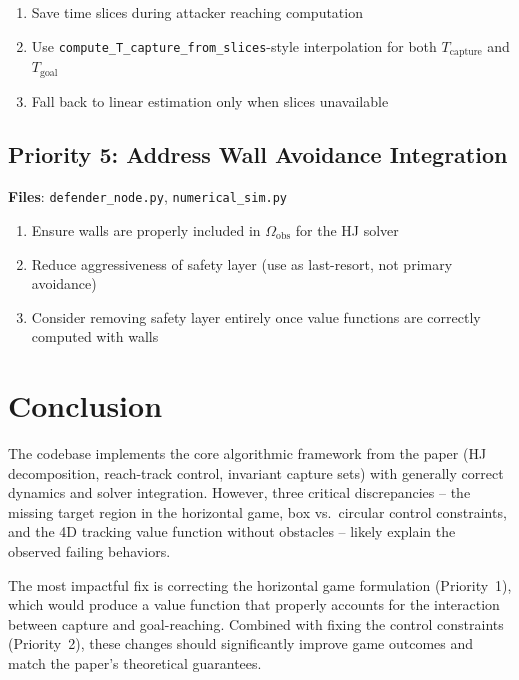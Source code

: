 \documentclass[11pt,a4paper]{article}
\begin{document}
\begin{enumerate}[nosep]
\item Save time slices during attacker reaching computation
\item Use \texttt{compute\_T\_capture\_from\_slices}-style interpolation for both $T_{\mathrm{capture}}$ and $T_{\mathrm{goal}}$
\item Fall back to linear estimation only when slices unavailable
\end{enumerate}

\subsection{Priority 5: Address Wall Avoidance Integration}
\textbf{Files}: \texttt{defender\_node.py}, \texttt{numerical\_sim.py}

\begin{enumerate}[nosep]
\item Ensure walls are properly included in $\Omega_{\mathrm{obs}}$ for the HJ solver
\item Reduce aggressiveness of safety layer (use as last-resort, not primary avoidance)
\item Consider removing safety layer entirely once value functions are correctly computed with walls
\end{enumerate}

\section{Conclusion}

The codebase implements the core algorithmic framework from the paper (HJ decomposition, reach-track control, invariant capture sets) with generally correct dynamics and solver integration. However, three critical discrepancies -- the missing target region in the horizontal game, box vs.\ circular control constraints, and the 4D tracking value function without obstacles -- likely explain the observed failing behaviors.

The most impactful fix is correcting the horizontal game formulation (Priority~1), which would produce a value function that properly accounts for the interaction between capture and goal-reaching. Combined with fixing the control constraints (Priority~2), these changes should significantly improve game outcomes and match the paper's theoretical guarantees.
\end{document}
